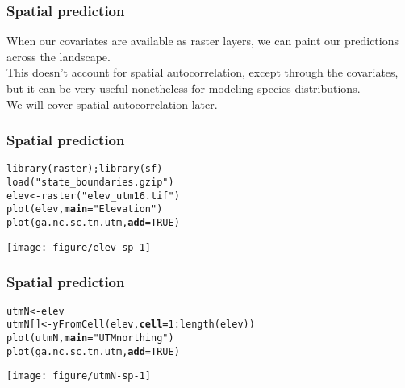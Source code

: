 \documentclass[color=usenames,dvipsnames]{beamer}\usepackage[]{graphicx}\usepackage[]{color}
\makeatletter
\newcommand{\hlnum}[1]{\textcolor[rgb]{0.69,0.494,0}{#1}}%
\newcommand{\hlstr}[1]{\textcolor[rgb]{0.749,0.012,0.012}{#1}}%
\newcommand{\hlopt}[1]{\textcolor[rgb]{0,0,0}{#1}}%
\newcommand{\hlstd}[1]{\textcolor[rgb]{0,0,0}{#1}}%
\newcommand{\hlkwb}[1]{\textcolor[rgb]{0,0.341,0.682}{#1}}%
\newcommand{\hlkwc}[1]{\textcolor[rgb]{0,0,0}{\textbf{#1}}}%
\newcommand{\hlkwd}[1]{\textcolor[rgb]{0.004,0.004,0.506}{#1}}%
\newenvironment{kframe}{%
 \def\at@end@of@kframe{}%
 \ifinner\ifhmode%
  \def\at@end@of@kframe{\end{minipage}}%
  \begin{minipage}{\columnwidth}%
 \fi\fi%
 \def\FrameCommand##1{\hskip\@totalleftmargin \hskip-\fboxsep
 \colorbox{shadecolor}{##1}\hskip-\fboxsep
     \hskip-\linewidth \hskip-\@totalleftmargin \hskip\columnwidth}%
 \MakeFramed {\advance\hsize-\width
   \@totalleftmargin\z@ \linewidth\hsize
   \@setminipage}}%
 {\par\unskip\endMakeFramed%
 \at@end@of@kframe}
\newenvironment{knitrout}{}{} %
\makeatother
\begin{document}
\begin{frame}
  \frametitle{Spatial prediction}
  When our covariates are available as raster layers, we can paint our
  predictions across the landscape. \\
  \pause
  \vfill
  This doesn't account for spatial autocorrelation, except through the
  covariates, but it can be very useful nonetheless for modeling
  species distributions. \\
  \pause
  \vfill
  We will cover spatial autocorrelation later. 
\end{frame}



\begin{frame}[fragile]
  \frametitle{Spatial prediction}
\begin{knitrout}\scriptsize
{}\color{fgcolor}\begin{kframe}
\begin{alltt}
\hlkwd{library}\hlstd{(raster);} \hlkwd{library}\hlstd{(sf)}
\hlkwd{load}\hlstd{(}\hlstr{"state_boundaries.gzip"}\hlstd{)}
\hlstd{elev} \hlkwb{<-} \hlkwd{raster}\hlstd{(}\hlstr{"elev_utm16.tif"}\hlstd{)}
\hlkwd{plot}\hlstd{(elev,} \hlkwc{main}\hlstd{=}\hlstr{"Elevation"}\hlstd{)}
\hlkwd{plot}\hlstd{(ga.nc.sc.tn.utm,} \hlkwc{add}\hlstd{=}\hlnum{TRUE}\hlstd{)}
\end{alltt}
\end{kframe}

{\centering \texttt{[image: figure/elev-sp-1]} 

}


\end{knitrout}
\end{frame}




\begin{frame}[fragile]
  \frametitle{Spatial prediction}
\begin{knitrout}\scriptsize
{}\color{fgcolor}\begin{kframe}
\begin{alltt}
\hlstd{utmN} \hlkwb{<-} \hlstd{elev}
\hlstd{utmN[]} \hlkwb{<-} \hlkwd{yFromCell}\hlstd{(elev,} \hlkwc{cell}\hlstd{=}\hlnum{1}\hlopt{:}\hlkwd{length}\hlstd{(elev))}
\hlkwd{plot}\hlstd{(utmN,} \hlkwc{main}\hlstd{=}\hlstr{"UTM northing"}\hlstd{)}
\hlkwd{plot}\hlstd{(ga.nc.sc.tn.utm,} \hlkwc{add}\hlstd{=}\hlnum{TRUE}\hlstd{)}
\end{alltt}
\end{kframe}

{\centering \texttt{[image: figure/utmN-sp-1]} 

}


\end{knitrout}
\end{frame}
\end{document}
